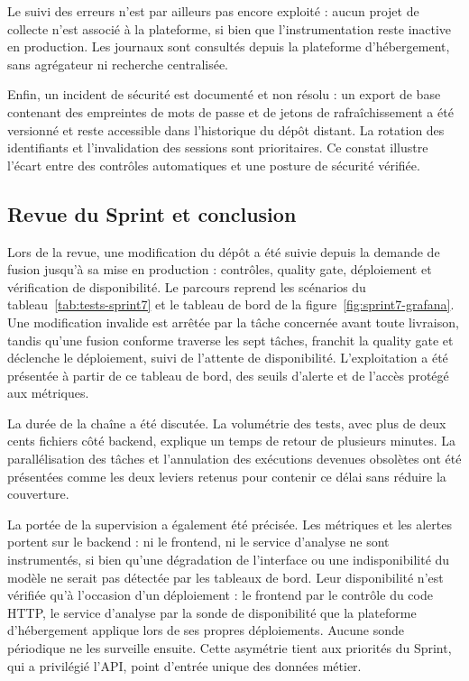 Le suivi des erreurs n'est par ailleurs pas encore exploité : aucun projet de collecte n'est associé à la plateforme, si bien que l'instrumentation reste inactive en production. Les journaux sont consultés depuis la plateforme d'hébergement, sans agrégateur ni recherche centralisée.

Enfin, un incident de sécurité est documenté et non résolu : un export de base contenant des empreintes de mots de passe et de jetons de rafraîchissement a été versionné et reste accessible dans l'historique du dépôt distant. La rotation des identifiants et l'invalidation des sessions sont prioritaires. Ce constat illustre l'écart entre des contrôles automatiques et une posture de sécurité vérifiée.

\subsection{Revue du Sprint et conclusion}

Lors de la revue, une modification du dépôt a été suivie depuis la demande de fusion jusqu'à sa mise en production : contrôles, quality gate, déploiement et vérification de disponibilité. Le parcours reprend les scénarios du tableau~\ref{tab:tests-sprint7} et le tableau de bord de la figure~\ref{fig:sprint7-grafana}. Une modification invalide est arrêtée par la tâche concernée avant toute livraison, tandis qu'une fusion conforme traverse les sept tâches, franchit la quality gate et déclenche le déploiement, suivi de l'attente de disponibilité. L'exploitation a été présentée à partir de ce tableau de bord, des seuils d'alerte et de l'accès protégé aux métriques.

La durée de la chaîne a été discutée. La volumétrie des tests, avec plus de deux cents fichiers côté backend, explique un temps de retour de plusieurs minutes. La parallélisation des tâches et l'annulation des exécutions devenues obsolètes ont été présentées comme les deux leviers retenus pour contenir ce délai sans réduire la couverture.

La portée de la supervision a également été précisée. Les métriques et les alertes portent sur le backend : ni le frontend, ni le service d'analyse ne sont instrumentés, si bien qu'une dégradation de l'interface ou une indisponibilité du modèle ne serait pas détectée par les tableaux de bord. Leur disponibilité n'est vérifiée qu'à l'occasion d'un déploiement : le frontend par le contrôle du code HTTP, le service d'analyse par la sonde de disponibilité que la plateforme d'hébergement applique lors de ses propres déploiements. Aucune sonde périodique ne les surveille ensuite. Cette asymétrie tient aux priorités du Sprint, qui a privilégié l'API, point d'entrée unique des données métier.


